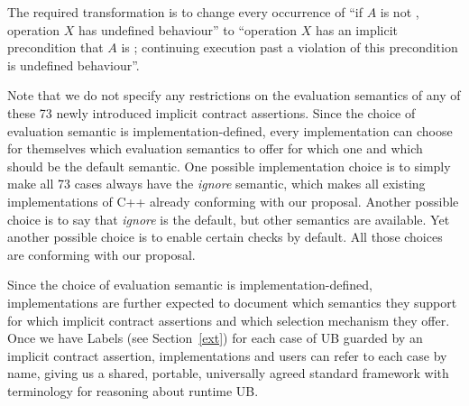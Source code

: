 The required transformation is to change every occurrence of “if $A$ is not , operation $X$ has undefined behaviour'' to ``operation $X$ has an implicit precondition that $A$ is ; continuing execution past a violation of this precondition is undefined behaviour''.

Note that we do not specify any restrictions on the evaluation semantics of any of these 73 newly introduced  implicit contract assertions. Since the choice of evaluation semantic is implementation-defined, every implementation can choose for themselves which evaluation semantics to offer for which one and which should be the default semantic. One possible implementation choice is to simply make all 73 cases always have the \emph{ignore} semantic, which makes all existing implementations of C++ already conforming with our proposal. Another possible choice is to say that  \emph{ignore} is the default, but other semantics are available. Yet another possible choice is to enable certain checks by default. All those choices are conforming with our proposal.

Since the choice of evaluation semantic is  implementation-defined, implementations are further expected to document which semantics they support for which implicit contract assertions and which selection mechanism they offer. Once we have Labels (see Section~\ref{ext}) for each case of UB guarded by an implicit contract assertion, implementations and users can refer to each case by name, giving us a shared, portable, universally agreed standard framework with terminology for reasoning about runtime UB.

